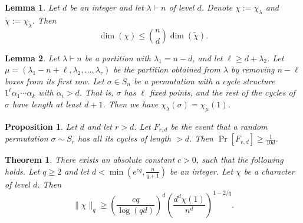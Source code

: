 \documentclass[10pt,a4paper]{amsart}
\newtheorem{thm}{Theorem}
\newtheorem{lem}{Lemma}
\newtheorem{proposition}{Proposition}
\renewcommand\ge{\geqslant}
\renewcommand\le{\leqslant}
\begin{document}
\begin{lem}\label{lem: dimension of characters converse}
Let $d$ be an integer and let $\lambda\vdash n$ of level $d$. Denote $\chi := \chi_\lambda$ and $\tilde{\chi} := \chi_{\tilde{\lambda}}$.
Then 
\[\dim(\chi) \le \binom{n}{d}\dim(\tilde{\chi}).\]
\end{lem}

\begin{lem} \label{lem:murnaghan nakayama remove long cycles}
    Let $\lambda \vdash n$ be a partition with $\lambda_1 = n-d$, and let $\ell \ge d + \lambda_2$. Let $\mu = (\lambda_1 - n + \ell, \lambda_2, \ldots, \lambda_r)$ be the partition obtained from $\lambda$ by removing $n-\ell$ boxes from its first row. Let $\sigma \in S_n$ be a permutation with a cycle structure $1^\ell \alpha_1\cdots \alpha_k$ with $\alpha_i > d$. That is, $\sigma$ has $\ell$ fixed points, and the rest of the cycles of $\sigma$ have length at least $d+1$. Then we have $\chi_{\lambda}(\sigma) = \chi_{\mu}(1)$.
\end{lem}

\begin{proposition} \label{prop:probability no short cycles}
    Let $d$ and let $r>d$. Let $F_{r,d}$ be the event that a random permutation $\sigma\sim S_r$ has all its cycles of length $>d$. Then $\Pr[F_{r,d}]\ge \frac{1}{10d}$.
\end{proposition}

\begin{thm}\label{thm:matching lower bound for main}
There exists an absolute constant $c>0$, such that the following holds. Let $q\ge 2$ and let $d < \min(e^{cq},\frac{n}{q+1})$ be an integer. Let $\chi$ be a character of level $d$. Then  
\[
\| \chi\|_q \ge \left( \frac{cq}{\log (qd)} \right)^d\left(\frac{d^d \chi(1)}{n^d}\right)^{1-2/q}. 
\]
\end{thm}
\end{document}

